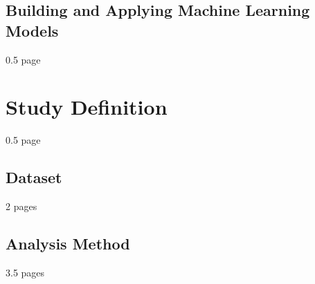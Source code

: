 \subsection{Building and Applying Machine Learning Models}

0.5 page
	
\section{Study Definition}

0.5 page

\subsection{Dataset}

2 pages

\subsection{Analysis Method}

3.5 pages